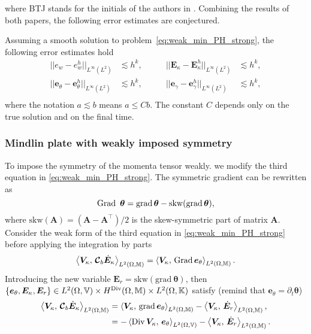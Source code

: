 where BTJ stands for the initials of the authors in \cite{becache2000wave,becache2001elas}. Combining the results of both papers, the following error estimates are conjectured.
\begin{conjecture}\label{conj:BJTestimates}
	Assuming a smooth solution to problem~\eqref{eq:weak_min_PH_strong}, the following error estimates hold 
	\begin{equation}
	\label{eq:errBEC}
	\begin{aligned}
	||e_w - e_w^h||_{L^{\infty}(L^2)} &\lesssim h^{k}, \\
	||\bm{e}_\theta - \bm{e}_\theta^h||_{L^{\infty}(L^2)} &\lesssim h^{k}, \\
	\end{aligned} \qquad
	\begin{aligned}
	||\bm{E}_\kappa - \bm{E}_\kappa^h||_{L^{\infty}(L^2)} &\lesssim  h^{k}, \\
	||\bm{e}_\gamma - \bm{e}_\gamma^ h||_{L^{\infty}(L^2)} &\lesssim  h^{k}, \\
	\end{aligned} 
	\end{equation}
	where the notation $a \lesssim  b$ means $a \le C b$. The constant $C$ depends only on the true solution and on the final time.
\end{conjecture}


\subsubsection{Mindlin plate with weakly imposed symmetry}\label{sec:min_weak}
To impose the symmetry of the momenta tensor weakly. we modify the third equation in \eqref{eq:weak_min_PH_strong}. The symmetric gradient can be rewritten as 
\[
\Grad\ \bm{\theta} = \grad \bm{\theta} - \mathrm{skw}(\grad \bm{\theta}),
\]
where $\mathrm{skw}(\bm{A})=(\bm{A} - \bm{A}^\top)/2$ is the skew-symmetric part of matrix $\bm{A}$. Consider the weak form of the third equation in \eqref{eq:weak_min_PH_strong} before applying the integration by parts
\[
\inner[L^2(\Omega, \mathbb{M})]{\bm{V}_\kappa}{\bm{\mathcal{C}}_b \dot{\bm{E}}_\kappa} = \inner[L^2(\Omega, \mathbb{M})]{\bm{V}_\kappa}{\Grad \bm{e}_\theta}. 
\] Introducing the new variable $\bm{E}_r = \mathrm{skw}(\mathrm{grad}\ \bm{\theta})$, then $\{\bm{e}_\theta, \bm{E}_\kappa, \bm{E}_r\} \in L^2(\Omega, \mathbb{V}) \times H^{\Div}(\Omega, \mathbb{M}) \times L^2(\Omega, \mathbb{K})$ satisfy (remind that $\bm{e}_\theta = \partial_t {\bm{\theta}}$)
\begin{equation*}
\begin{aligned}
\inner[L^2(\Omega, \mathbb{M})]{\bm{V}_\kappa}{\bm{\mathcal{C}}_b \dot{\bm{E}}_\kappa} &= \inner[L^2(\Omega, \mathbb{M})]{\bm{V}_\kappa}{\grad \bm{e}_\theta} - \inner[L^2(\Omega, \mathbb{M})]{\bm{V}_\kappa}{\dot{\bm{E}}_r}, \\
&= -\inner[L^2(\Omega, \mathbb{V})]{\Div\bm{V}_\kappa}{\bm{e}_\theta} - \inner[L^2(\Omega, \mathbb{M})]{\bm{V}_\kappa}{\dot{\bm{E}}_r}.
\end{aligned}
\end{equation*}


